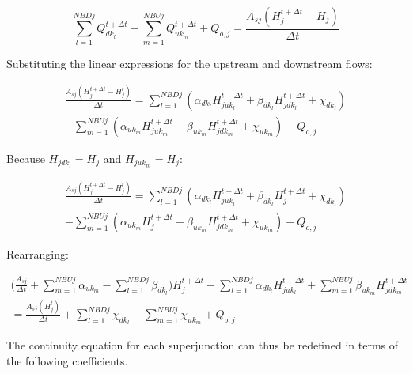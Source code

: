 \documentclass[11pt]{article}
\begin{document}
\begin{equation}
  \sum_{l=1}^{NBDj} Q_{dk_l}^{t + \Delta t} - \sum_{m=1}^{NBUj} Q_{uk_m}^{t + \Delta t} + Q_{o,j} = \frac{A_{sj} (H_j^{t + \Delta t} - H_j)}{\Delta t}
\end{equation}

Substituting the linear expressions for the upstream and downstream flows:

\begin{equation}
  \begin{split}
    \frac{A_{sj} (H_j^{t + \Delta t} - H_j^t)}{\Delta t} =
    \sum_{l=1}^{NBDj} (\alpha_{dk_l} H_{juk_l}^{t + \Delta t} + \beta_{dk_l}
    H_{jdk_l}^{t + \Delta t} + \chi_{dk_l}) \\
    - \sum_{m=1}^{NBUj} (\alpha_{uk_m}
    H_{juk_m}^{t + \Delta t} + \beta_{uk_m} H_{jdk_m}^{t + \Delta t} + \chi_{uk_m}) +
    Q_{o,j}
  \end{split}
\end{equation}

Because $H_{jdk_l} = H_j$ and $H_{juk_m} = H_j$:

\begin{equation}
  \begin{split}
    \frac{A_{sj} (H_j^{t + \Delta t} - H_j^t)}{\Delta t} =
    \sum_{l=1}^{NBDj} (\alpha_{dk_l} H_{juk_l}^{t + \Delta t} + \beta_{dk_l}
    H_{j}^{t + \Delta t} + \chi_{dk_l})\\
    - \sum_{m=1}^{NBUj} (\alpha_{uk_m}
    H_{j}^{t + \Delta t} + \beta_{uk_m} H_{jdk_m}^{t + \Delta t} + \chi_{uk_m}) +
    Q_{o,j}
  \end{split}
\end{equation}

Rearranging:

\begin{equation}
  \begin{split}
    \biggl( \frac{A_{sj}}{\Delta t} + \sum_{m=1}^{NBUj} \alpha_{uk_m} - \sum_{l=1}^{NBDj} \beta_{dk_l} \biggr) H_j^{t + \Delta t} 
    - \sum_{l=1}^{NBDj} \alpha_{dk_l} H_{juk_l}^{t + \Delta t} + \sum_{m=1}^{NBUj} \beta_{uk_m} H_{jdk_m}^{t + \Delta t} \\
    =
    \frac{A_{sj} (H_j^t)}{\Delta t} + \sum_{l=1}^{NBDj} \chi_{dk_l} - \sum_{m=1}^{NBUj} \chi_{uk_m} + Q_{o,j}
  \end{split}
\end{equation}

The continuity equation for each superjunction can thus be redefined in terms of
the following coefficients.
\end{document}
